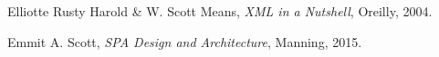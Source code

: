 \begin{thebibliography}{9}

  Elliotte Rusty Harold \& W. Scott Means,
  \textit{XML in a Nutshell},
  Oreilly,
  2004.

  Emmit A. Scott,
  \textit{SPA Design and Architecture},
  Manning,
  2015.
\end{thebibliography}
